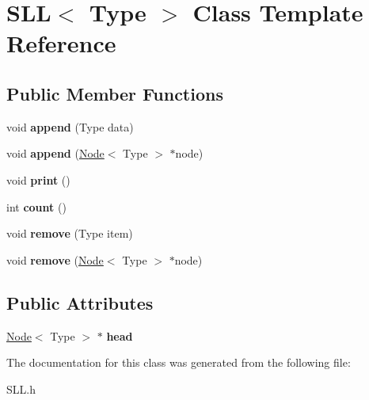 \hypertarget{class_s_l_l}{}\section{S\+LL$<$ Type $>$ Class Template Reference}
\label{class_s_l_l}
\subsection*{Public Member Functions}
\begin{DoxyCompactItemize}
\item 
\mbox{\label{class_s_l_l_a4a183f28b712006ca9e6c86f7052cc39}} 
void {\bfseries append} (Type data)
\item 
\mbox{\label{class_s_l_l_ac0745119053c511f59f5ffb50d99b3d7}} 
void {\bfseries append} (\mbox{\hyperlink{class_node}{Node}}$<$ Type $>$ $\ast$node)
\item 
\mbox{\label{class_s_l_l_a251fa3c50d9fb5bb6247ce1dd9bd4a3d}} 
void {\bfseries print} ()
\item 
\mbox{\label{class_s_l_l_a4e9e7161dfba0cea42fd2a805e4883df}} 
int {\bfseries count} ()
\item 
\mbox{\label{class_s_l_l_af0b39dec9cebd5991b992ae4cadff2ba}} 
void {\bfseries remove} (Type item)
\item 
\mbox{\label{class_s_l_l_a4da3d7fa252ba1e747da867977aeede8}} 
void {\bfseries remove} (\mbox{\hyperlink{class_node}{Node}}$<$ Type $>$ $\ast$node)
\end{DoxyCompactItemize}
\subsection*{Public Attributes}
\begin{DoxyCompactItemize}
\item 
\mbox{\label{class_s_l_l_a8fed5c8dc2b39042c515d1473119dadb}} 
\mbox{\hyperlink{class_node}{Node}}$<$ Type $>$ $\ast$ {\bfseries head}
\end{DoxyCompactItemize}


The documentation for this class was generated from the following file\+:\begin{DoxyCompactItemize}
\item 
S\+L\+L.\+h\end{DoxyCompactItemize}
